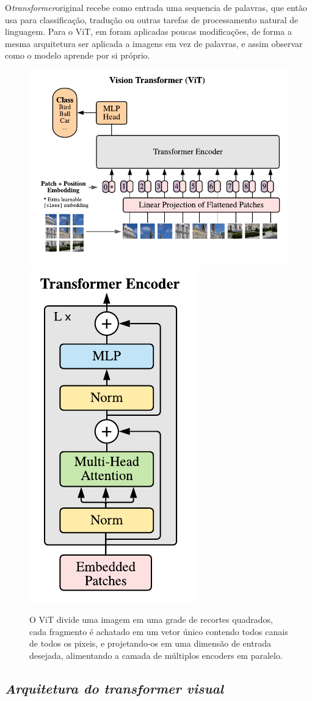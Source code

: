 O\textit{transformer}original recebe como entrada uma sequencia de palavras, que então usa para classificação, tradução ou outras tarefas de processamento natural de linguagem. Para o ViT, em \cite{dosovitskiy2020image} foram aplicadas poucas modificações, de forma a mesma arquitetura ser aplicada a imagens em vez de palavras, e assim observar como o modelo aprende por si próprio.

\begin{figure}[!ht]
    \centering
    \includegraphics[width=0.65\columnwidth]{
        Imagens/vit.png
    }
    \includegraphics[width=0.34\columnwidth]{
        Imagens/encoder.png
    }
    \caption{O ViT divide uma imagem em uma grade de recortes quadrados, cada fragmento é achatado em um vetor único contendo todos canais de todos os pixeis, e projetando-os em uma dimensão de entrada desejada, alimentando a camada de múltiplos encoders em paralelo. \cite{dosovitskiy2020image}}
    \label{fig:vit}
\end{figure}


\subsection{\textit{Arquitetura do \textit{transformer} visual}}\label{sec:Cap2_vit}

